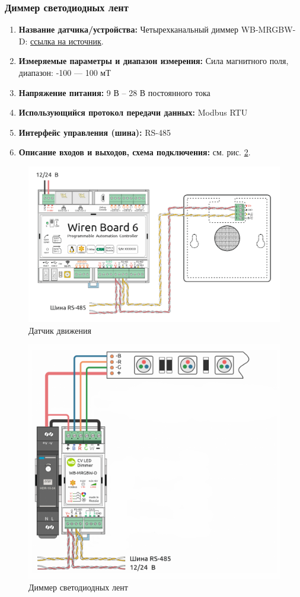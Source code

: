 \documentclass[a4paper,14pt]{extarticle}
\begin{document}
\begin{problem}
	\subsubsection*{Диммер светодиодных лент}
	
	\begin{enumerate}
		\item \textbf{Название датчика/устройства:}  Четырехканальный диммер WB-MRGBW-D: \href{https://wirenboard.com/ru/product/WB-MRGBW-D/}{ссылка на источник}.
		
		
		
		\item  \textbf{Измеряемые параметры и диапазон измерения:} Сила магнитного поля, диапазон: -100 --- 100 мТ
		
		\item  \textbf{Напряжение питания:} 9 В – 28 В постоянного тока
		
		\item  \textbf{Использующийся протокол передачи данных:} Modbus RTU
		
		\item  \textbf{Интерфейс управления (шина):} RS-485
		
		\item  \textbf{Описание входов и выходов, схема подключения:} см. рис. \ref{fig:device-5}.
	\end{enumerate}
	
	
	\begin{figure}[htpb]
		\centering
		\includegraphics[width=0.5\linewidth]{images/device-4}
		\caption{Датчик движения}
		\label{fig:device-4}
	\end{figure}
	
	\begin{figure}[htpb]
		\centering
		\includegraphics[width=0.5\linewidth]{images/device-5}
		\caption{Диммер светодиодных лент }
		\label{fig:device-5}
	\end{figure}
	
\end{problem}
\end{document}
